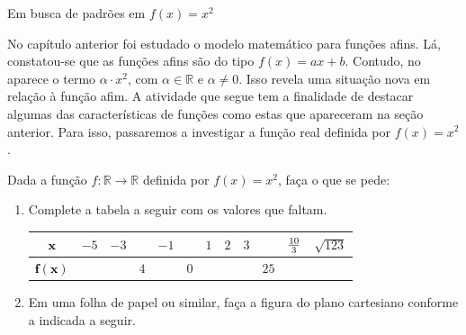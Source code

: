 \label{\detokenize{AF209-2:sec-funcao-quadratica-propriedades-de-x-a-2}}\label{\detokenize{AF209-2::doc}}\label{\detokenize{AF209-2:explorando-a-funcao-real-definida-por}}\label{\detokenize{AF209-2:ativ-funcao-quadratica-investigando-x-a-2}}
\begin{task}{Em busca de padrões em \(f(x)=x^2\)}

No capítulo anterior foi estudado o modelo matemático para funções afins. Lá, constatou-se que as funções afins são do tipo \(f(x)=ax+b\). Contudo, no {\hyperref[\detokenize{AF209-0:sec-funcao-quadratica-movimento-com-velocidade-variavel-queda-vertical}]{}} aparece o termo \(\alpha \cdot x^2\), com \(\alpha \in \mathbb{R}\) e \(\alpha \neq 0\). Isso revela uma situação nova em relação à função afim. A atividade que segue tem a finalidade de destacar algumas das características de funções como estas que apareceram na seção anterior. Para isso, passaremos a investigar a função real definida por \(f(x)=x^2\).

Dada a função \(f: \mathbb{R} \to \mathbb{R}\) definida por \(f(x)=x^2\), faça o que se pede:
\begin{enumerate}
\item {} 
Complete a tabela a seguir com os valores que faltam.

\begin{table}[H]
\setlength
\tabulinesep{1mm}
\centering
\begin{tabu} to \textwidth{|c|c|c|c|c|c|c|c|c|c|c|c|}
\hline
{}\textcolor{black}{\(\bm{x}\)} & \(-5\) & \(-3\) & & \(-1\) & & \(1\) & \(2\) & \(3\) & & \(10 \over 3\) & \(\sqrt{123}\) \\
\hline
{}\textcolor{black}{$\bm{f(x)}$} & & & \(4\) & & \(0\) & & & & \(25\) & & \\
\hline
\end{tabu}
\end{table}


\item {} 
Em uma folha de papel ou similar, faça a figura do plano cartesiano conforme a indicada a seguir.
\begin{figure}[H]
\centering


\end{figure}
\end{enumerate}
\end{task}
